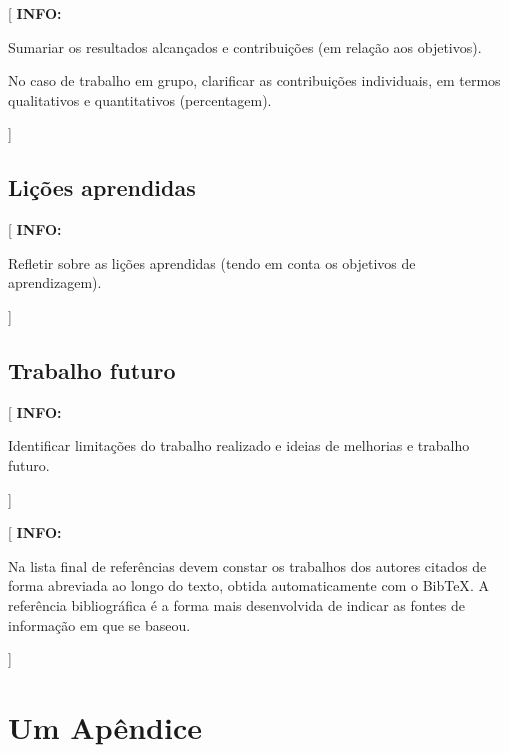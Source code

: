 \documentclass[11pt,a4paper]{report}
\newcommand{\class}[1]{{\normalfont\sffamily #1\/}}
\newenvironment{info}[1]{\vspace*{6mm}\color{blue}[ \textbf{INFO:} \begin{em} #1}
                        {\vspace*{3mm}\end{em} ]}
\begin{document}
\begin{info}
Sumariar os resultados alcançados e contribuições (em relação aos  objetivos).

No caso de trabalho em grupo, clarificar as contribuições individuais, em termos qualitativos e quantitativos (percentagem).
\end{info}

\lipsum[11]

\section{Lições aprendidas}

\begin{info}
Refletir sobre as lições aprendidas (tendo em conta os objetivos de aprendizagem).
\end{info}

\lipsum[12]

\section{Trabalho futuro}

\begin{info}
Identificar limitações do trabalho realizado e ideias de melhorias e trabalho futuro.
\end{info}




\renewcommand{\bibname}{Referências bibliográficas}
\printbibliography
{}  %

\begin{info}
Na lista final de referências devem constar os trabalhos dos autores
citados de forma abreviada ao longo do texto, obtida automaticamente
com o \class{BibTeX}.
A referência bibliográfica é a forma mais desenvolvida de indicar as
fontes de informação em que se baseou. 
\end{info}


\appendix
\chapter{Um Apêndice}
\end{document}
